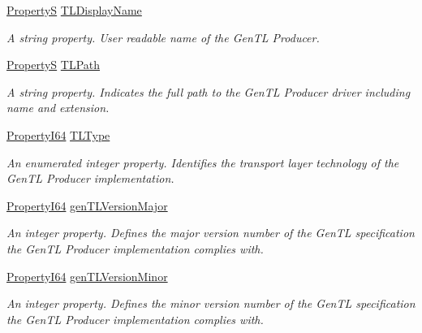 \begin{DoxyCompactItemize}
\hyperlink{classmv_i_m_p_a_c_t_1_1acquire_1_1_property_s}{Property\+S} \hyperlink{classmv_i_m_p_a_c_t_1_1acquire_1_1_gen_i_cam_1_1_system_module_ab5c343774dcbce2bf1b54dd14138ed95}{T\+L\+Display\+Name}
\begin{DoxyCompactList}\small\item\em A string property. User readable name of the Gen\+T\+L Producer. \end{DoxyCompactList}\item 
\hyperlink{classmv_i_m_p_a_c_t_1_1acquire_1_1_property_s}{Property\+S} \hyperlink{classmv_i_m_p_a_c_t_1_1acquire_1_1_gen_i_cam_1_1_system_module_ab4b4281b0bb95e222f94a4f9df7922e4}{T\+L\+Path}
\begin{DoxyCompactList}\small\item\em A string property. Indicates the full path to the Gen\+T\+L Producer driver including name and extension. \end{DoxyCompactList}\item 
\hyperlink{group___common_interface_ga81749b2696755513663492664a18a893}{Property\+I64} \hyperlink{classmv_i_m_p_a_c_t_1_1acquire_1_1_gen_i_cam_1_1_system_module_a483183eb91826654275c0861dce3e1cd}{T\+L\+Type}
\begin{DoxyCompactList}\small\item\em An enumerated integer property. Identifies the transport layer technology of the Gen\+T\+L Producer implementation. \end{DoxyCompactList}\item 
\hyperlink{group___common_interface_ga81749b2696755513663492664a18a893}{Property\+I64} \hyperlink{classmv_i_m_p_a_c_t_1_1acquire_1_1_gen_i_cam_1_1_system_module_a0d18ebd0935c13034576105263123ea6}{gen\+T\+L\+Version\+Major}
\begin{DoxyCompactList}\small\item\em An integer property. Defines the major version number of the Gen\+T\+L specification the Gen\+T\+L Producer implementation complies with. \end{DoxyCompactList}\item 
\hyperlink{group___common_interface_ga81749b2696755513663492664a18a893}{Property\+I64} \hyperlink{classmv_i_m_p_a_c_t_1_1acquire_1_1_gen_i_cam_1_1_system_module_a7f7476e44901bb10365032ea76b2f57a}{gen\+T\+L\+Version\+Minor}
\begin{DoxyCompactList}\small\item\em An integer property. Defines the minor version number of the Gen\+T\+L specification the Gen\+T\+L Producer implementation complies with. \end{DoxyCompactList}\item 

\end{DoxyCompactItemize}
